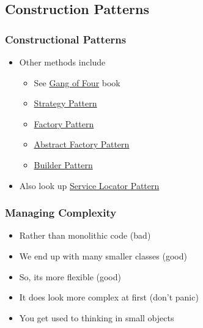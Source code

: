 \hypertarget{construction-patterns}{%
\subsection{Construction Patterns}\label{construction-patterns}}

\hypertarget{constructional-patterns}{%
\subsubsection{Constructional Patterns}\label{constructional-patterns}}

\begin{itemize}
\tightlist
\item
  Other methods include

  \begin{itemize}
  \tightlist
  \item
    See \href{https://en.wikipedia.org/wiki/Design_Patterns}{Gang of
    Four} book
  \item
    \href{https://en.wikipedia.org/wiki/Strategy_pattern}{Strategy
    Pattern}
  \item
    \href{https://en.wikipedia.org/wiki/Factory_method_pattern}{Factory
    Pattern}
  \item
    \href{https://en.wikipedia.org/wiki/Abstract_factory_pattern}{Abstract
    Factory Pattern}
  \item
    \href{https://en.wikipedia.org/wiki/Builder_pattern}{Builder
    Pattern}\\
  \end{itemize}
\item
  Also look up
  \href{https://en.wikipedia.org/wiki/Service_locator_pattern}{Service
  Locator Pattern}
\end{itemize}

\hypertarget{managing-complexity}{%
\subsubsection{Managing Complexity}\label{managing-complexity}}

\begin{itemize}
\tightlist
\item
  Rather than monolithic code (bad)
\item
  We end up with many smaller classes (good)
\item
  So, its more flexible (good)
\item
  It does look more complex at first (don't panic)
\item
  You get used to thinking in small objects
\end{itemize}

